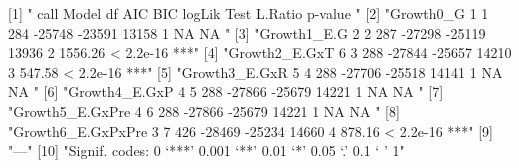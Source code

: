  [1] "                    call  Model     df    AIC    BIC logLik   Test L.Ratio   p-value    "
 [2] "Growth0_G              1      1    284 -25748 -23591  13158      1      NA        NA    "
 [3] "Growth1_E.G            2      2    287 -27298 -25119  13936      2 1556.26 < 2.2e-16 ***"
 [4] "Growth2_E.GxT          6      3    288 -27844 -25657  14210      3  547.58 < 2.2e-16 ***"
 [5] "Growth3_E.GxR          5      4    288 -27706 -25518  14141      1      NA        NA    "
 [6] "Growth4_E.GxP          4      5    288 -27866 -25679  14221      1      NA        NA    "
 [7] "Growth5_E.GxPre        4      6    288 -27866 -25679  14221      1      NA        NA    "
 [8] "Growth6_E.GxPxPre      3      7    426 -28469 -25234  14660      4  878.16 < 2.2e-16 ***"
 [9] "---"                                                                                     
[10] "Signif. codes:  0 ‘***’ 0.001 ‘**’ 0.01 ‘*’ 0.05 ‘.’ 0.1 ‘ ’ 1"                          

